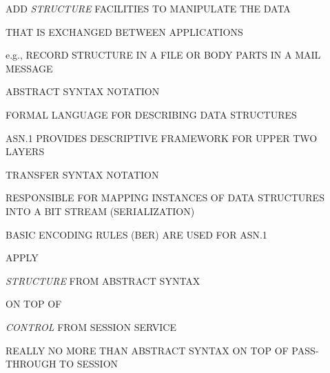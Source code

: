 \begin{bwslide}

\begin{nrtc}
\item	ADD \emph{STRUCTURE} FACILITIES TO MANIPULATE THE DATA

\item	THAT IS EXCHANGED BETWEEN APPLICATIONS
    \begin{nrtc}
    \item	e.g., RECORD STRUCTURE IN A FILE OR BODY PARTS IN A MAIL
		MESSAGE 
    \end{nrtc}
\end{nrtc}
\end{bwslide}


\begin{bwslide}

\begin{nrtc}
\item	ABSTRACT SYNTAX NOTATION
    \begin{nrtc}
    \item	FORMAL LANGUAGE FOR DESCRIBING DATA STRUCTURES

    \item	ASN.1 PROVIDES DESCRIPTIVE FRAMEWORK FOR UPPER TWO LAYERS
    \end{nrtc}

\item	TRANSFER SYNTAX NOTATION
    \begin{nrtc}
    \item	RESPONSIBLE FOR MAPPING INSTANCES OF DATA STRUCTURES
		INTO A BIT STREAM (SERIALIZATION)

    \item	BASIC ENCODING RULES (BER) ARE USED FOR ASN.1
    \end{nrtc}
\end{nrtc}
\end{bwslide}


\begin{bwslide}

\begin{nrtc}
\item	APPLY
    \begin{nrtc}
    \item	\emph{STRUCTURE} FROM ABSTRACT SYNTAX
    \end{nrtc}
	ON TOP OF
    \begin{nrtc}
    \item	\emph{CONTROL} FROM SESSION SERVICE
\end{nrtc}

\item	REALLY NO MORE THAN ABSTRACT SYNTAX ON TOP OF PASS-THROUGH TO SESSION
\end{nrtc}
\end{bwslide}



